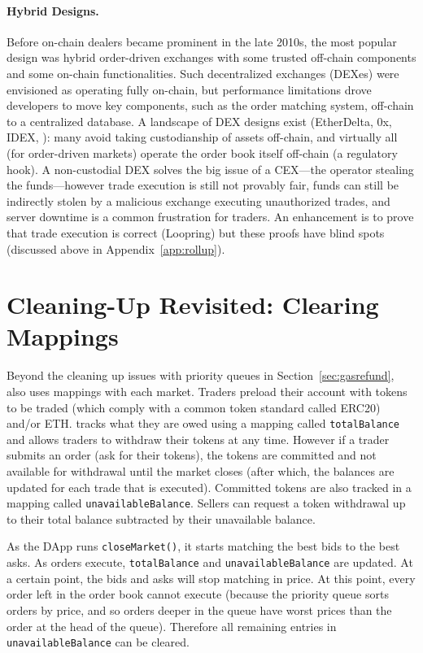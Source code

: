 \paragraph{Hybrid Designs.} Before on-chain dealers became prominent in the late 2010s, the most popular design was hybrid order-driven exchanges with some trusted off-chain components and some on-chain functionalities. Such decentralized exchanges (DEXes) were envisioned as operating fully on-chain, but performance limitations drove developers to move key components, such as the order matching system, off-chain to a centralized database. A landscape of DEX designs exist (\eg EtherDelta, 0x, IDEX, \etc): many avoid taking custodianship of assets off-chain, and virtually all (for order-driven markets) operate the order book itself off-chain (a regulatory hook). A non-custodial DEX solves the big issue of a CEX---the operator stealing the funds---however trade execution is still not provably fair, funds can still be indirectly stolen by a malicious exchange executing unauthorized trades, and server downtime is a common frustration for traders. An enhancement is to prove that trade execution is correct (\eg Loopring) but these proofs have blind spots (discussed above in Appendix~\ref{app:rollup}).



\section{Cleaning-Up Revisited: Clearing Mappings}
\label{app:clean}

Beyond the cleaning up issues with priority queues in Section~\ref{sec:gasrefund}, \cm also uses mappings with each market. Traders preload their account with tokens to be traded (which comply with a common token standard called ERC20) and/or ETH. \cm tracks what they are owed using a mapping called \texttt{totalBalance} and allows traders to withdraw their tokens at any time. However if a trader submits an order (\ie ask for their tokens), the tokens are committed and not available for withdrawal until the market closes (after which, the balances are updated for each trade that is executed). Committed tokens are also tracked in a mapping called \texttt{unavailableBalance}. Sellers can request a token withdrawal up to their total balance subtracted by their unavailable balance.

As the DApp runs \texttt{closeMarket()}, it starts matching the best bids to the best asks. As orders execute, \texttt{totalBalance} and \texttt{unavailableBalance} are updated. At a certain point, the bids and asks will stop matching in price. At this point, every order left in the order book cannot execute (because the priority queue sorts orders by price, and so orders deeper in the queue have worst prices than the order at the head of the queue). Therefore all remaining entries in \texttt{unavailableBalance} can be cleared.

